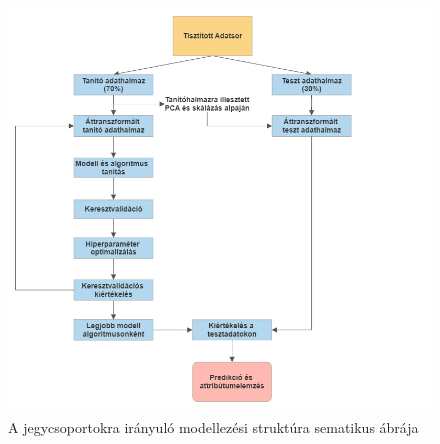 \documentclass[12pt]{article}
\begin{document}
\begin{figure}[h]
\centering
\includegraphics[scale=0.6]{kepek/flowchart.png}
\caption{A jegycsoportokra irányuló modellezési struktúra sematikus ábrája}
\label{fig:modell}
\end{figure}
\end{document}
